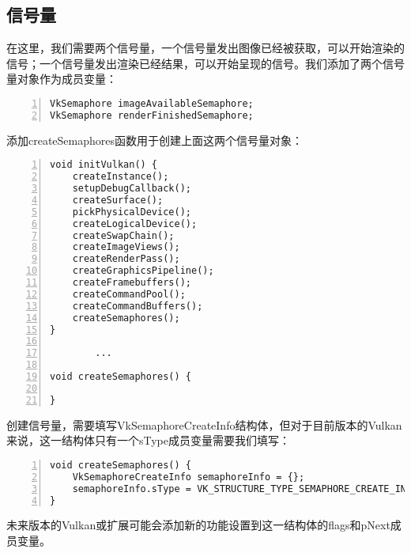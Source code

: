 \documentclass{ctexart}
\begin{document}
\subsection{信号量}

在这里，我们需要两个信号量，一个信号量发出图像已经被获取，可以开始渲染的信号；一个信号量发出渲染已经结果，可以开始呈现的信号。我们添加了两个信号量对象作为成员变量：

\begin{lstlisting}[language={[ANSI]C},keywordstyle=\color{blue!70},commentstyle=\color{red!50!green!50!blue!50},frame=shadowbox, rulesepcolor=\color{red!20!green!20!blue!20},basicstyle=\small,numbers=left, numberstyle=\tiny,breaklines=true]
VkSemaphore imageAvailableSemaphore;
VkSemaphore renderFinishedSemaphore;
\end{lstlisting}

添加createSemaphores函数用于创建上面这两个信号量对象：

\begin{lstlisting}[language={[ANSI]C},keywordstyle=\color{blue!70},commentstyle=\color{red!50!green!50!blue!50},frame=shadowbox, rulesepcolor=\color{red!20!green!20!blue!20},basicstyle=\small,numbers=left, numberstyle=\tiny,breaklines=true]
void initVulkan() {
	createInstance();
	setupDebugCallback();
	createSurface();
	pickPhysicalDevice();
	createLogicalDevice();
	createSwapChain();
	createImageViews();
	createRenderPass();
	createGraphicsPipeline();
	createFramebuffers();
	createCommandPool();
	createCommandBuffers();
	createSemaphores();
}

		...

void createSemaphores() {

}
\end{lstlisting}

创建信号量，需要填写VkSemaphoreCreateInfo结构体，但对于目前版本的Vulkan来说，这一结构体只有一个sType成员变量需要我们填写：

\begin{lstlisting}[language={[ANSI]C},keywordstyle=\color{blue!70},commentstyle=\color{red!50!green!50!blue!50},frame=shadowbox, rulesepcolor=\color{red!20!green!20!blue!20},basicstyle=\small,numbers=left, numberstyle=\tiny,breaklines=true]
void createSemaphores() {
	VkSemaphoreCreateInfo semaphoreInfo = {};
	semaphoreInfo.sType = VK_STRUCTURE_TYPE_SEMAPHORE_CREATE_INFO;
}
\end{lstlisting}

未来版本的Vulkan或扩展可能会添加新的功能设置到这一结构体的flags和pNext成员变量。
\end{document}
